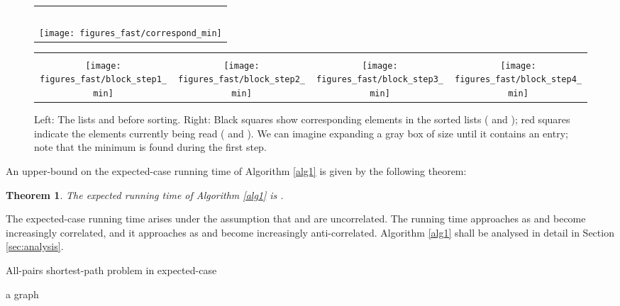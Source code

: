 \documentclass[a4paper,10pt]{article}
\newtheorem{theorem}{Theorem}
\begin{document}
\begin{figure*}[ht]
\footnotesize
\begin{center}
\parbox[c]{31.58pt}{\centering\begin{tabular}{c}
                                     \ \\ \texttt{[image: figures\_fast/correspond\_min]}
                                    \end{tabular}
}
\parbox[c]{309.38pt}
{\centering\begin{tabular}{cccc}
 &  &  & \\
\texttt{[image: figures\_fast/block\_step1\_min]} & \texttt{[image: figures\_fast/block\_step2\_min]} & \texttt{[image: figures\_fast/block\_step3\_min]} & \texttt{[image: figures\_fast/block\_step4\_min]}
\end{tabular}}
\end{center}
\vspace{-3mm}
 \caption{Left: The lists  and  before sorting. Right: Black squares show corresponding elements in the sorted lists ( and ); red squares indicate the elements currently being read ( and ). We can imagine expanding a gray box of size  until it contains an entry; note that the minimum is found during the first step.}
\label{fig:alg1}\end{figure*}

An upper-bound on the expected-case running time of Algorithm \ref{alg1} is given by the following theorem:
\begin{theorem}
 The \emph{expected} running time of Algorithm \ref{alg1} is .
\label{the:alg1}
\end{theorem}
The expected-case running time arises under the assumption that  and  are uncorrelated. The running time approaches  as  and  become increasingly correlated, and it approaches  as  and  become increasingly anti-correlated. Algorithm \ref{alg1} shall be analysed in detail in Section \ref{sec:analysis}.



\begin{algorithm}
 \caption{All-pairs shortest-path problem in expected-case }
 \label{alg:fast}
\begin{algorithmic}[1]
 \REQUIRE a graph 
 \FOR{}
   \FOR{}
     \STATE 
   \ENDFOR
 \ENDFOR
 \FOR{ \COMMENT{}}
   \FOR{}
   \ENDFOR\ \COMMENT{}
   \FOR{}
     \FOR{}
       \STATE  \COMMENT{}
       \STATE 
     \ENDFOR
   \ENDFOR\ \COMMENT{}
 \ENDFOR\ \COMMENT{}
\end{algorithmic}
\end{algorithm}
\end{document}
